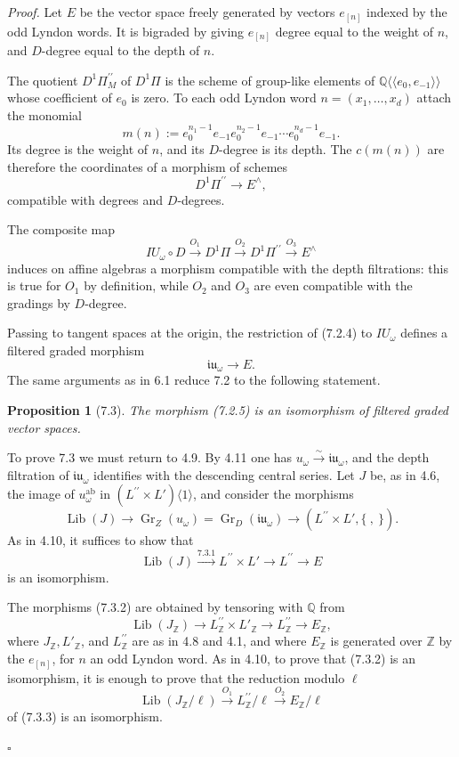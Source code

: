 \documentclass[10pt,a4paper]{article}
\newcommand{\Q}{\mathbb Q}
\newcommand{\Z}{\mathbb Z}
\newcommand{\Gr}{\operatorname{Gr}}
\newcommand{\Lib}{\operatorname{Lib}}
\theoremstyle{deligne}
\newtheorem*{proposition*}{Proposition}
\newenvironment{proofdel}{\textit{Proof.}}{\hfill$\square$}
\begin{document}
\begin{proofdel}
Let \(E\) be the vector space freely generated by vectors \(e_{[n]}\) indexed by the odd Lyndon words. It is bigraded by giving \(e_{[n]}\) degree equal to the weight of \(n\), and \(D\)-degree equal to the depth of \(n\).

The quotient \(D^1\Pi_M^{\prime\prime}\) of \(D^1\Pi\) is the scheme of group-like elements of \(\Q\langle\!\langle e_0,e_{-1}\rangle\!\rangle\) whose coefficient of \(e_0\) is zero. To each odd Lyndon word \(n=(x_1,\ldots,x_d)\) attach the monomial
\[
m(n):=e_0^{n_1-1}e_{-1}e_0^{n_2-1}e_{-1}\cdots e_0^{n_d-1}e_{-1}.
\]
Its degree is the weight of \(n\), and its \(D\)-degree is its depth. The \(c(m(n))\) are therefore the coordinates of a morphism of schemes
\[
\tag{7.2.3}
D^1\Pi^{\prime\prime}\longrightarrow E^\wedge,
\]
compatible with degrees and \(D\)-degrees.

The composite map
\[
\tag{7.2.4}
IU_\omega\circ D\xrightarrow{O_1}D^1\Pi\xrightarrow{O_2}D^1\Pi^{\prime\prime}\xrightarrow{O_3}E^\wedge
\]
induces on affine algebras a morphism compatible with the depth filtrations: this is true for \(O_1\) by definition, while \(O_2\) and \(O_3\) are even compatible with the gradings by \(D\)-degree.

Passing to tangent spaces at the origin, the restriction of (7.2.4) to \(IU_\omega\) defines a filtered graded morphism
\[
\tag{7.2.5}
\mathfrak{iu}_\omega\longrightarrow E.
\]
The same arguments as in 6.1 reduce 7.2 to the following statement.

\begin{proposition*}[7.3]
The morphism (7.2.5) is an isomorphism of filtered graded vector spaces.
\end{proposition*}

To prove 7.3 we must return to 4.9. By 4.11 one has \(u_\omega\overset{\sim}{\longrightarrow}\mathfrak{iu}_\omega\), and the depth filtration of \(\mathfrak{iu}_\omega\) identifies with the descending central series. Let \(J\) be, as in 4.6, the image of \(u_\omega^{\mathrm{ab}}\) in \((L^{\prime\prime}\times L')\langle1\rangle\), and consider the morphisms
\[
\tag{7.3.1}
\Lib(J)\longrightarrow \Gr_Z(u_\omega)=\Gr_D(\mathfrak{iu}_\omega)\longrightarrow (L^{\prime\prime}\times L',\{\ ,\ \}).
\]
As in 4.10, it suffices to show that
\[
\tag{7.3.2}
\Lib(J)\xrightarrow{7.3.1}L^{\prime\prime}\times L'\longrightarrow L^{\prime\prime}\longrightarrow E
\]
is an isomorphism.

The morphisms (7.3.2) are obtained by tensoring with \(\Q\) from
\[
\tag{7.3.3}
\Lib(J_\Z)\longrightarrow L^{\prime\prime}_\Z\times L'_\Z\longrightarrow L^{\prime\prime}_\Z\longrightarrow E_\Z,
\]
where \(J_\Z,L'_\Z\), and \(L^{\prime\prime}_\Z\) are as in 4.8 and 4.1, and where \(E_\Z\) is generated over \(\Z\) by the \(e_{[n]}\), for \(n\) an odd Lyndon word. As in 4.10, to prove that (7.3.2) is an isomorphism, it is enough to prove that the reduction modulo \(\ell\)
\[
\tag{7.3.4}
\Lib(J_\Z/\ell)\xrightarrow{O_1}L^{\prime\prime}_\Z/\ell\xrightarrow{O_2}E_\Z/\ell
\]
of (7.3.3) is an isomorphism.


\end{proofdel}
\end{document}

